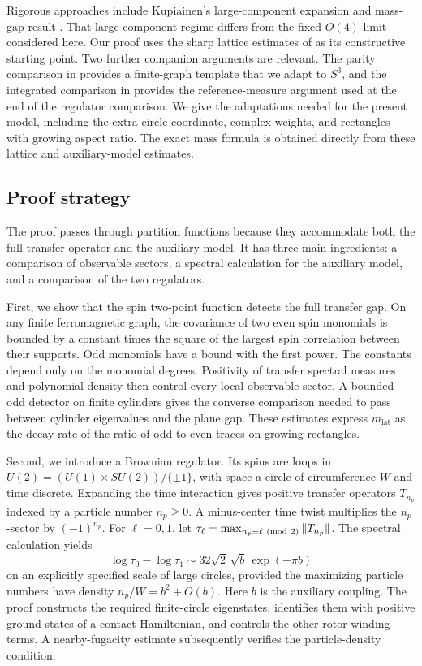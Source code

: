 Rigorous approaches include Kupiainen's large-component expansion and
mass-gap result \cite{Kupiainen1980}. That large-component regime differs
from the fixed-\(O(4)\) limit considered here. Our proof uses the sharp
lattice estimates of \cite{SharpO4} as its
constructive starting point. Two further companion arguments are relevant.
The parity comparison in \cite[Section~4]{O3Pole} provides a finite-graph template that
we adapt to \(S^3\), and the integrated comparison in \cite[Section~7]{O3Continuum}
provides the reference-measure argument used at the end of the regulator
comparison. We give the adaptations needed for the present model, including
the extra circle coordinate, complex weights, and rectangles with growing
aspect ratio. The exact mass formula is obtained directly from these lattice
and auxiliary-model estimates.

\subsection{Proof strategy}

The proof passes through partition functions because they accommodate both
the full transfer operator and the auxiliary model. It has three main
ingredients: a comparison of observable sectors, a spectral calculation for
the auxiliary model, and a comparison of the two regulators.

First, we show that the spin two-point function detects the full transfer
gap. On any finite ferromagnetic graph, the covariance of two even spin
monomials is bounded by a constant times the square of the largest spin
correlation between their supports. Odd monomials have a bound with the first
power. The constants depend only on the monomial degrees. Positivity of
transfer spectral measures and polynomial density then control every local
observable sector. A bounded odd detector on finite cylinders gives the
converse comparison needed to pass between cylinder eigenvalues and the
plane gap. These estimates express \(m_{\mathrm{lat}}\) as the decay rate of
the ratio of odd to even traces on growing rectangles.

Second, we introduce a Brownian regulator. Its spins are loops in
\(U(2)=(U(1)\times SU(2))/\{\pm1\}\), with space a circle of circumference
\(W\) and time discrete. Expanding the time interaction gives positive
transfer operators \(T_{n_p}\) indexed by a particle number
\(n_p\geq0\). A minus-center time twist multiplies the
\(n_p\)-sector by \((-1)^{n_p}\). For \(\ell=0,1\), let
\(\tau_\ell=\max_{n_p\equiv\ell\ ({\rm mod}\ 2)}\|T_{n_p}\|\).
The spectral calculation yields
\begin{equation}\label{eq:overview-brownian}
 \log\tau_0-\log\tau_1
       \sim 32\sqrt2\,\sqrt b\,\exp(-\pi b)
\end{equation}
on an explicitly specified scale of large circles, provided the maximizing
particle numbers have density \(n_p/W=b^2+O(b)\). Here \(b\) is the
auxiliary coupling. The proof constructs the required finite-circle
eigenstates, identifies them with positive ground states of a contact
Hamiltonian, and controls the other rotor winding terms. A nearby-fugacity
estimate subsequently verifies the particle-density condition.

